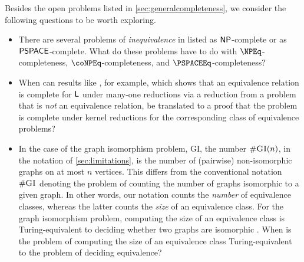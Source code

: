 Besides the open problems listed in \autoref{sec:generalcompleteness}, we consider the following questions to be worth exploring.
\begin{itemize}
\item There are several problems of \emph{inequivalence} in \autocite{gj79} listed as ${\mathsf{NP}}$-complete or as ${\mathsf{PSPACE}}$-complete.
  What do these problems have to do with $\NPEq$-completeness, $\coNPEq$-completeness, and $\PSPACEEq$-completeness?
\item When can results like \autocite[Theorem~1]{rs11}, for example, which shows that an equivalence relation is complete for ${\mathsf{L}}$ under many-one reductions via a reduction from a problem that is \emph{not} an equivalence relation, be translated to a proof that the problem is complete under kernel reductions for the corresponding class of equivalence problems?
\item
  In the case of the graph isomorphism problem, \textsc{GI}, the number $\#\textsc{GI}(n)$, in the notation of \autoref{sec:limitations}, is the number of (pairwise) non-isomorphic graphs on at most $n$ vertices.
  This differs from the conventional notation $\#\textsc{GI}$ denoting the problem of counting the number of graphs isomorphic to a given graph.
  In other words, our notation counts the \emph{number} of equivalence classes, whereas the latter counts the \emph{size} of an equivalence class.
  For the graph isomorphism problem, computing the size of an equivalence class is Turing-equivalent to deciding whether two graphs are isomorphic \autocite[Theorem~1.24]{kst93}.
  When is the problem of computing the size of an equivalence class Turing-equivalent to the problem of deciding equivalence?
\end{itemize}
